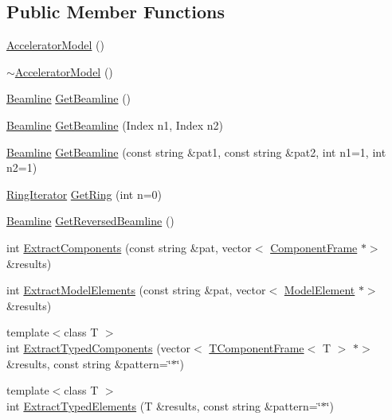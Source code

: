 \subsection*{Public Member Functions}
\begin{DoxyCompactItemize}
\item 
\hyperlink{classAcceleratorModel_a6a9e7ceecf090ae7b8039eb45ab897e0}{Accelerator\+Model} ()
\item 
\hyperlink{classAcceleratorModel_a5d8c8baa3e2f5e041e366d99bb4e23e0}{$\sim$\+Accelerator\+Model} ()
\item 
\hyperlink{classAcceleratorModel_1_1Beamline}{Beamline} \hyperlink{classAcceleratorModel_ac5cc18e6817b0ca55c1df440af3fcec8}{Get\+Beamline} ()
\item 
\hyperlink{classAcceleratorModel_1_1Beamline}{Beamline} \hyperlink{classAcceleratorModel_a4fa60bb81f95cd89b3b990ecd07fd030}{Get\+Beamline} (Index n1, Index n2)
\item 
\hyperlink{classAcceleratorModel_1_1Beamline}{Beamline} \hyperlink{classAcceleratorModel_ad83c41dd787735b484204018be25ff0b}{Get\+Beamline} (const string \&pat1, const string \&pat2, int n1=1, int n2=1)
\item 
\hyperlink{classring__iterator}{Ring\+Iterator} \hyperlink{classAcceleratorModel_ab1da9f1e5c94b3d59a04a4039f3fe208}{Get\+Ring} (int n=0)
\item 
\hyperlink{classAcceleratorModel_1_1Beamline}{Beamline} \hyperlink{classAcceleratorModel_ab24870490b1f431466744a4881137717}{Get\+Reversed\+Beamline} ()
\item 
int \hyperlink{classAcceleratorModel_a2f800545bb423bd9e23329dbf06e7aab}{Extract\+Components} (const string \&pat, vector$<$ \hyperlink{classComponentFrame}{Component\+Frame} $\ast$$>$ \&results)
\item 
int \hyperlink{classAcceleratorModel_a4793bccb6ce6bebfe6552dfc34de0ba3}{Extract\+Model\+Elements} (const string \&pat, vector$<$ \hyperlink{classModelElement}{Model\+Element} $\ast$$>$ \&results)
\item 
{\footnotesize template$<$class T $>$ }\\int \hyperlink{classAcceleratorModel_a05ba8806c80eb1cc1110fedeb0053fa1}{Extract\+Typed\+Components} (vector$<$ \hyperlink{classTComponentFrame}{T\+Component\+Frame}$<$ T $>$ $\ast$$>$ \&results, const string \&pattern=\char`\"{}$\ast$\char`\"{})
\item 
{\footnotesize template$<$class T $>$ }\\int \hyperlink{classAcceleratorModel_ace0602a999a9f0aaa4bcf4fe7a387c74}{Extract\+Typed\+Elements} (T \&results, const string \&pattern=\char`\"{}$\ast$\char`\"{})
$$
\end{DoxyCompactItemize}
